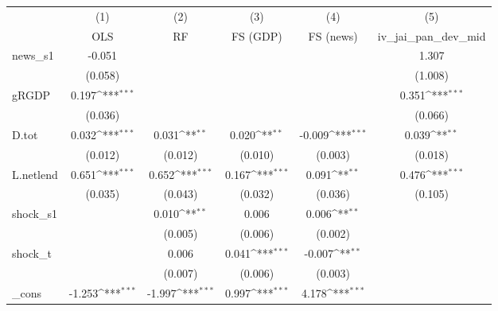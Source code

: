 {
\def\sym#1{\ifmmode^{#1}\else\(^{#1}\)\fi}
\begin{tabular}{l*{5}{c}}
\toprule
            &\multicolumn{1}{c}{(1)}&\multicolumn{1}{c}{(2)}&\multicolumn{1}{c}{(3)}&\multicolumn{1}{c}{(4)}&\multicolumn{1}{c}{(5)}\\
            &\multicolumn{1}{c}{OLS}&\multicolumn{1}{c}{RF}&\multicolumn{1}{c}{FS (GDP)}&\multicolumn{1}{c}{FS (news)}&\multicolumn{1}{c}{iv\_jai\_pan\_dev\_mid}\\
\midrule
news\_s1     &      -0.051         &                     &                     &                     &       1.307         \\
            &     (0.058)         &                     &                     &                     &     (1.008)         \\
\addlinespace
gRGDP       &       0.197\sym{***}&                     &                     &                     &       0.351\sym{***}\\
            &     (0.036)         &                     &                     &                     &     (0.066)         \\
\addlinespace
D.tot       &       0.032\sym{***}&       0.031\sym{**} &       0.020\sym{**} &      -0.009\sym{***}&       0.039\sym{**} \\
            &     (0.012)         &     (0.012)         &     (0.010)         &     (0.003)         &     (0.018)         \\
\addlinespace
L.netlend   &       0.651\sym{***}&       0.652\sym{***}&       0.167\sym{***}&       0.091\sym{**} &       0.476\sym{***}\\
            &     (0.035)         &     (0.043)         &     (0.032)         &     (0.036)         &     (0.105)         \\
\addlinespace
shock\_s1    &                     &       0.010\sym{**} &       0.006         &       0.006\sym{**} &                     \\
            &                     &     (0.005)         &     (0.006)         &     (0.002)         &                     \\
\addlinespace
shock\_t     &                     &       0.006         &       0.041\sym{***}&      -0.007\sym{**} &                     \\
            &                     &     (0.007)         &     (0.006)         &     (0.003)         &                     \\
\addlinespace
\_cons      &      -1.253\sym{***}&      -1.997\sym{***}&       0.997\sym{***}&       4.178\sym{***}&                     \\

\end{tabular}}
